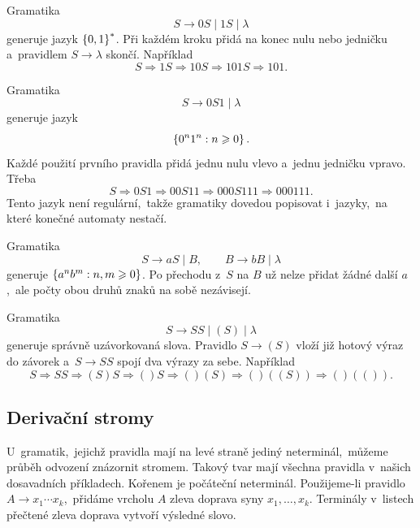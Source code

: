 \begin{example}
    Gramatika
    \[
        S\to0S\mid1S\mid\lambda
    \]
    generuje jazyk $\left\{0,1\right\}^*$. Při každém kroku přidá na konec nulu nebo jedničku a~pravidlem $S\to\lambda$ skončí. Například
    \[
        S\Rightarrow1S\Rightarrow10S\Rightarrow101S\Rightarrow101.
    \]
\end{example}

\begin{example}
    Gramatika
    \[
        S\to0S1\mid\lambda
    \]
    generuje jazyk
    \[
        \left\{0^n1^n:n\geqslant0\right\}.
    \]
    Každé použití prvního pravidla přidá jednu nulu vlevo a~jednu jedničku vpravo. Třeba
    \[
        S\Rightarrow0S1\Rightarrow00S11\Rightarrow000S111
        \Rightarrow000111.
    \]
    Tento jazyk není regulární,~takže gramatiky dovedou popisovat i~jazyky,~na které konečné automaty nestačí.
\end{example}

\begin{example}
    Gramatika
    \[
        S\to aS\mid B,\qquad B\to bB\mid\lambda
    \]
    generuje $\left\{a^nb^m:n,m\geqslant0\right\}$. Po přechodu z~$S$ na $B$ už nelze přidat žádné další $a$,~ale počty obou druhů znaků na sobě nezávisejí.
\end{example}

\begin{example}
    Gramatika
    \[
        S\to SS\mid(S)\mid\lambda
    \]
    generuje správně uzávorkovaná slova. Pravidlo $S\to(S)$ vloží již hotový výraz do závorek a~$S\to SS$ spojí dva výrazy za sebe. Například
    \[
        S\Rightarrow SS\Rightarrow(S)S\Rightarrow()S
        \Rightarrow()(S)\Rightarrow()((S))\Rightarrow()(()).
    \]
\end{example}

\subsection{Derivační stromy}

U~gramatik,~jejichž pravidla mají na levé straně jediný neterminál,~můžeme průběh odvození znázornit stromem. Takový tvar mají všechna pravidla v~našich dosavadních příkladech. Kořenem je počáteční neterminál. Použijeme-li pravidlo $A\to x_1\cdots x_k$,~přidáme vrcholu $A$ zleva doprava syny $x_1,\dots,x_k$. Terminály v~listech přečtené zleva doprava vytvoří výsledné slovo.

